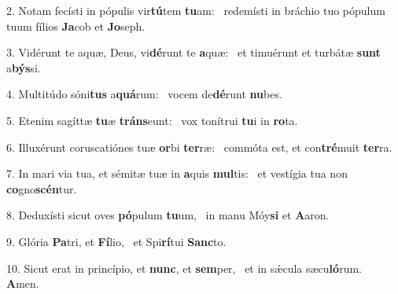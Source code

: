 2. Notam fecísti in pópulis vir\textbf{tú}tem \textbf{tu}am: \ast\  redemísti in bráchio tuo pópulum tuum fílios \textbf{Ja}cob et \textbf{Jo}seph.\

3. Vidérunt te aquæ, Deus, vi\textbf{dé}runt te \textbf{a}quæ: \ast\  et timuérunt et turbátæ \textbf{sunt} a\textbf{býs}si.\

4. Multitúdo sóni\textbf{tus} a\textbf{quá}rum: \ast\  vocem de\textbf{dé}runt \textbf{nu}bes.\

5. Etenim sagíttæ \textbf{tu}æ \textbf{tráns}eunt: \ast\  vox tonítrui \textbf{tu}i in \textbf{ro}ta.\

6. Illuxérunt coruscatiónes tuæ \textbf{or}bi \textbf{ter}ræ: \ast\  commóta est, et con\textbf{tré}muit \textbf{ter}ra.\

7. In mari via tua, et sémitæ tuæ in \textbf{a}quis \textbf{mul}tis: \ast\  et vestígia tua non \textbf{co}gno\textbf{scén}tur.\

8. Deduxísti sicut oves \textbf{pó}pulum \textbf{tu}um, \ast\  in manu Móy\textbf{si} et \textbf{A}aron.\

9. Glória \textbf{Pa}tri, et \textbf{Fí}lio, \ast\  et Spi\textbf{rí}tui \textbf{Sanc}to.\

10. Sicut erat in princípio, et \textbf{nunc}, et \textbf{sem}per, \ast\  et in sǽcula sæcu\textbf{ló}rum. \textbf{A}men.\

